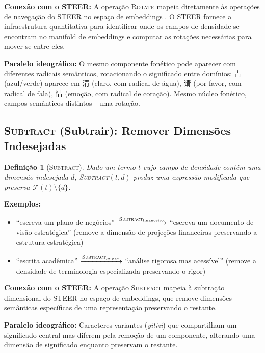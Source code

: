 \documentclass[12pt,a4paper]{article}
\newcommand{\cjk}[1]{{\cjkfont #1}}
\newtheorem{definition}{Definição}[section]
\begin{document}
\textbf{Conexão com o STEER:}
A operação \textsc{Rotate} mapeia diretamente às operações de navegação do STEER no espaço de embeddings \cite{gomes2026steer}.
O STEER fornece a infraestrutura quantitativa para identificar onde os campos de densidade se encontram no manifold de embeddings e computar as rotações necessárias para mover-se entre eles.

\textbf{Paralelo ideográfico:}
O mesmo componente fonético pode aparecer com diferentes radicais semânticos, rotacionando o significado entre domínios: \cjk{青} (azul/verde) aparece em \cjk{清} (claro, com radical de água), \cjk{请} (por favor, com radical de fala), \cjk{情} (emoção, com radical de coração).
Mesmo núcleo fonético, campos semânticos distintos---uma rotação.

\subsection{\textsc{Subtract} (Subtrair): Remover Dimensões Indesejadas}
\label{subsec:subtract}

\begin{definition}[\textsc{Subtract}]
Dado um termo $t$ cujo campo de densidade contém uma dimensão indesejada $d$, \textsc{Subtract}$(t, d)$ produz uma expressão modificada que preserva $\mathcal{F}(t) \setminus \{d\}$.
\end{definition}

\textbf{Exemplos:}
\begin{itemize}
  \item ``escreva um plano de negócios'' $\xrightarrow{\textsc{Subtract}_{\text{financeiro}}}$ ``escreva um documento de visão estratégica'' (remove a dimensão de projeções financeiras preservando a estrutura estratégica)
  \item ``escrita acadêmica'' $\xrightarrow{\textsc{Subtract}_{\text{jargão}}}$ ``análise rigorosa mas acessível'' (remove a densidade de terminologia especializada preservando o rigor)
\end{itemize}

\textbf{Conexão com o STEER:}
A operação \textsc{Subtract} mapeia à subtração dimensional do STEER no espaço de embeddings, que remove dimensões semânticas específicas de uma representação preservando o restante.

\textbf{Paralelo ideográfico:}
Caracteres variantes (\textit{yitizi}) que compartilham um significado central mas diferem pela remoção de um componente, alterando uma dimensão de significado enquanto preservam o restante.
\end{document}
